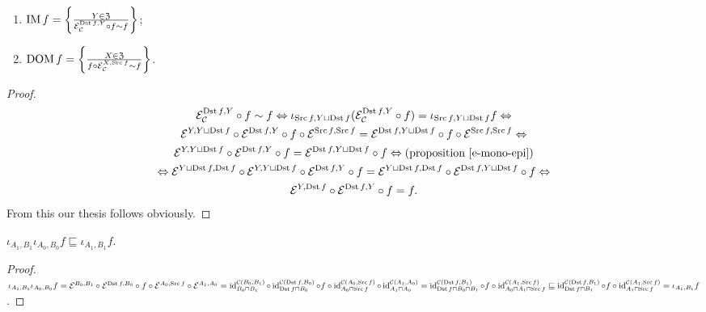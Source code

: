\begin{prop}
~
\begin{enumerate}
\item $\operatorname{IM} f = \left\{ \frac{Y \in \mathfrak{Z}}{
  \mathcal{E}_{\mathcal{C}}^{\operatorname{Dst} f, Y} \circ f \sim f}\right\}$;
\item $\operatorname{DOM} f = \left\{ \frac{X \in \mathfrak{Z}}{
  f\circ\mathcal{E}_{\mathcal{C}}^{X, \operatorname{Src} f} \sim f}\right\}$.
\end{enumerate}
\end{prop}

\begin{proof}
~
\begin{multline*}
\mathcal{E}_{\mathcal{C}}^{\operatorname{Dst} f, Y} \circ f \sim f
\Leftrightarrow
\iota_{\operatorname{Src} f,Y\sqcup\operatorname{Dst} f}
(\mathcal{E}_{\mathcal{C}}^{\operatorname{Dst} f, Y} \circ f) =
\iota_{\operatorname{Src} f,Y\sqcup\operatorname{Dst} f}f \Leftrightarrow \\
\mathcal{E}^{Y,Y\sqcup\operatorname{Dst} f}\circ\mathcal{E}^{\operatorname{Dst} f, Y} \circ f \circ \mathcal{E}^{\operatorname{Src} f,\operatorname{Src} f} =
\mathcal{E}^{\operatorname{Dst} f,Y\sqcup\operatorname{Dst} f}\circ f\circ\mathcal{E}^{\operatorname{Src} f,\operatorname{Src} f} \Leftrightarrow \\
\mathcal{E}^{Y,Y\sqcup\operatorname{Dst} f}\circ\mathcal{E}^{\operatorname{Dst} f, Y}\circ f=\mathcal{E}^{\operatorname{Dst} f,Y\sqcup\operatorname{Dst} f}\circ f
\Leftrightarrow \text{(proposition~\ref{e-mono-epi})} \\ \Leftrightarrow
\mathcal{E}^{Y\sqcup\operatorname{Dst} f,\operatorname{Dst} f}\circ \mathcal{E}^{Y,Y\sqcup\operatorname{Dst} f}\circ\mathcal{E}^{\operatorname{Dst} f, Y}\circ f=\mathcal{E}^{Y\sqcup\operatorname{Dst} f,\operatorname{Dst} f}\circ \mathcal{E}^{\operatorname{Dst} f,Y\sqcup\operatorname{Dst} f}\circ f \Leftrightarrow \\
\mathcal{E}^{Y,\operatorname{Dst} f}\circ\mathcal{E}^{\operatorname{Dst} f,Y}\circ f = f.
\end{multline*}
From this our thesis follows obviously.
\end{proof}

\begin{prop}\label{iota-less}
$\iota_{A_1,B_1}\iota_{A_0,B_0}f\sqsubseteq\iota_{A_1,B_1}f$.
\end{prop}

\begin{proof}
$\iota_{A_1,B_1}\iota_{A_0,B_0}f=
\mathcal{E}^{B_0,B_1}\circ\mathcal{E}^{\operatorname{Dst} f,B_0}\circ f\circ
\mathcal{E}^{A_0,\operatorname{Src} f}\circ\mathcal{E}^{A_1,A_0}=
\operatorname{id}^{\mathcal{C}(B_0,B_1)}_{B_0\sqcap B_1}\circ\operatorname{id}^{\mathcal{C}(\operatorname{Dst} f,B_0)}_{\operatorname{Dst} f\sqcap B_0}
\circ f\circ
\operatorname{id}^{\mathcal{C}(A_0,\operatorname{Src} f)}_{A_0\sqcap\operatorname{Src} f}\circ
\operatorname{id}^{\mathcal{C}(A_1,A_0)}_{A_1\sqcap A_0}=
\operatorname{id}^{\mathcal{C}(\operatorname{Dst} f,B_1)}_{\operatorname{Dst} f\sqcap B_0\sqcap B_1}
\circ f\circ
\operatorname{id}^{\mathcal{C}(A_1,\operatorname{Src} f)}_{A_0\sqcap A_1\sqcap\operatorname{Src} f}
\sqsubseteq
\operatorname{id}^{\mathcal{C}(\operatorname{Dst} f,B_1)}_{\operatorname{Dst} f\sqcap B_1}
\circ f\circ
\operatorname{id}^{\mathcal{C}(A_1,\operatorname{Src} f)}_{A_1\sqcap\operatorname{Src} f}=
\iota_{A_1,B_1}f$.
\end{proof}


